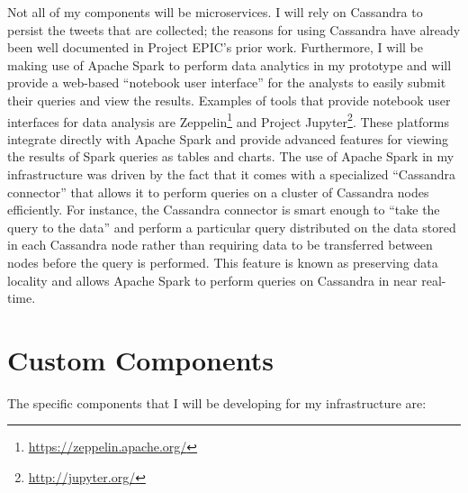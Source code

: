 Not all of my components will be microservices. I will rely on Cassandra to persist the tweets that are collected; the reasons for using Cassandra have already been well documented in Project EPIC’s prior work.\parencite{icse11,oopsla12,hiccs15} Furthermore, I will be making use of Apache Spark to perform data analytics in my prototype and will provide a web-based “notebook user interface” for the analysts to easily submit their queries and view the results. Examples of tools that provide notebook user interfaces for data analysis are Zeppelin\footnote{\href{https://zeppelin.apache.org/}{https://zeppelin.apache.org/}} and Project Jupyter\footnote{\href{http://jupyter.org/}{http://jupyter.org/}}. These platforms integrate directly with Apache Spark and provide advanced features for viewing the results of Spark queries as tables and charts. The use of Apache Spark in my infrastructure was driven by the fact that it comes with a specialized “Cassandra connector” that allows it to perform queries on a cluster of Cassandra nodes efficiently. For instance, the Cassandra connector is smart enough to “take the query to the data” and perform a particular query distributed on the data stored in each Cassandra node rather than requiring data to be transferred between nodes before the query is performed. This feature is known as preserving data locality and allows Apache Spark to perform queries on Cassandra in near real-time.

\section{Custom Components}

The specific components that I will be developing for my infrastructure are:

